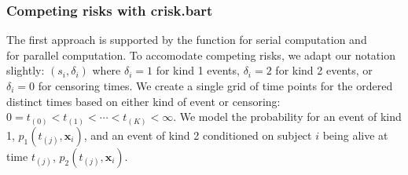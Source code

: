 \documentclass[article]{jss}
\begin{document}
\subsubsection{Competing risks with crisk.bart}

The first approach is supported by the function  for
serial computation and\\  for parallel
computation.  %
To accomodate competing risks, we adapt our notation slightly:
$(s_i, \delta_i)$ where $\delta_i=1$ for kind 1 events, $\delta_i=2$
for kind 2 events, or $\delta_i=0$ for censoring times.  We create a
single grid of time points for the ordered distinct times based on
either kind of event or censoring:
$0=t_{(0)}< t_{(1)}<\cdots < t_{(K)} < \infty$.  %
We model the probability for an event of kind 1,
$p_1(t_{(j)}, \bm{x}_i)$, and an event of kind 2 conditioned on subject $i$ being alive at time
$t_{(j)}$, $p_2(t_{(j)}, \bm{x}_i)$.  %
\end{document}
